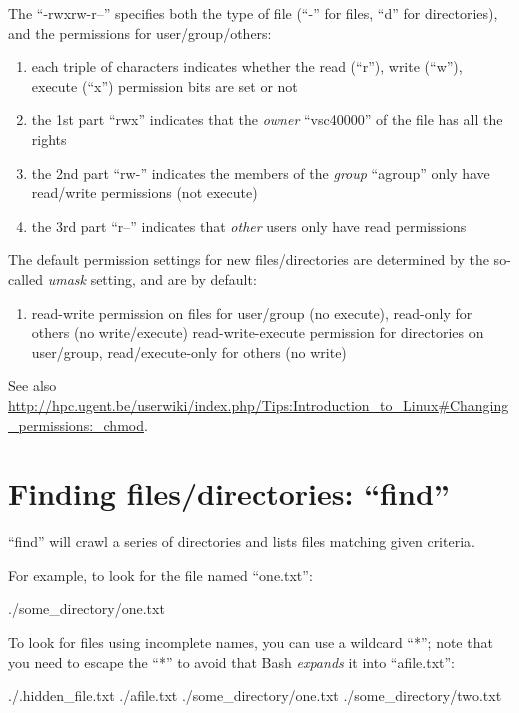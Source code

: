 The ``-rwxrw-r--'' specifies both the type of file (``-'' for files, ``d'' for directories), and the permissions for user/group/others:

\begin{enumerate}
\item each triple of characters indicates whether the read (``r''), write (``w''), execute (``x'') permission bits are set or not 
\item the 1st part ``rwx'' indicates that the \emph{owner} ``vsc40000'' of the file has all the rights
\item the 2nd part ``rw-'' indicates the members of the \emph{group} ``agroup'' only have read/write permissions (not execute)
\item the 3rd part ``r--'' indicates that \emph{other} users only have read permissions
\end{enumerate}

The default permission settings for new files/directories are determined by the so-called \emph{umask} setting, and are by default:

\begin{enumerate}
\item read-write permission on files for user/group (no execute), read-only for others (no write/execute)
\tem read-write-execute permission for directories on user/group, read/execute-only for others (no write)
\end{enumerate}

See also \url{http://hpc.ugent.be/userwiki/index.php/Tips:Introduction_to_Linux#Changing_permissions:_chmod}.

\section{Finding files/directories: ``find''}

``find'' will crawl a series of directories and lists files matching given criteria.

For example, to look for the file named ``one.txt'':

\begin{prompt}
  ./some_directory/one.txt
\end{prompt}

To look for files using incomplete names, you can use a wildcard ``*''; note
that you need to escape the ``*'' to avoid that Bash \emph{expands} it into
``afile.txt'':

\begin{prompt}
  ./.hidden_file.txt
  ./afile.txt
  ./some_directory/one.txt
  ./some_directory/two.txt 
\end{prompt}

